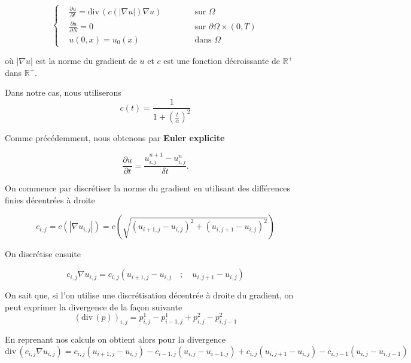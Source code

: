 \documentclass[a4paper,12pt,twoside]{report}
\newcommand{\R}{\mathbb{R}}
\newcommand{\1}{\mathbb{1}}
\renewcommand{\div}{\mathrm{div}\,}
\begin{document}
	\begin{equation*}
	\left\{
	\begin{aligned}
	&\frac{\partial u}{\partial t} = \div\left(c\left(\left|\nabla u\right|\right)\nabla u\right) &\qquad &\text{ sur } \Omega \\
	&\frac{\partial u}{\partial N} = 0 &\qquad &\text{ sur } \partial \Omega \times \left(0,T\right) \\
	&u(0,x) = u_0(x) &\qquad &\text{ dans } \Omega 
	\end{aligned}
	\right.
	\end{equation*}
	
	où $\left|\nabla u\right|$ est la norme du gradient de $u$ et $c$ est une fonction décroissante de $\R^+$ dans $\R^+$. 
	
	Dans notre cas, nous utiliserons 
	\[
	c(t) = \displaystyle\frac{1}{1+\left(\frac{t}{\alpha}\right)^2}	
	\]

	Comme précédemment, nous obtenons par \textbf{Euler explicite}
	
	\begin{equation*}
	\frac{\partial u}{\partial t}=\frac{u^{n+1}_{i,j}-u^{n}_{i,j}}{\delta t}.
	\end{equation*}
	
	On commence par discrétiser la norme du gradient en utilisant des différences finies décentrées à droite
	 
	\begin{equation*}
	c_{i,j} = c\left(\left|\nabla u_{i,j}\right|\right) = c\left(\sqrt{(u_{i+1,j}-u_{i,j})^2 +(u_{i,j+1} -u_{i,j})^2}\right)
	\end{equation*}
	
	On discrétise ensuite
	
	\begin{equation*}
	c_{i,j}\nabla u_{i,j} = c_{i,j}\left(u_{i+1,j}-u_{i,j} \quad ;\quad u_{i,j+1}-u_{i,j}\right)
	\end{equation*}
	
	On sait que, si l'on utilise une discrétisation décentrée à droite du gradient, on peut exprimer la divergence de la façon suivante
	\[
	\left(\div\left(p\right)\right)_{i,j} = p^1_{i,j} - p^1_{i-1,j} + p^2_{i,j} - p^2_{i,j-1}
	\]
	
	En reprenant nos calculs on obtient alors pour la divergence 	
	\begin{equation*}
	\div\left(c_{i,j}\nabla u_{i,j}\right) =  c_{i,j}\left(u_{i+1,j}-u_{i,j}\right)-c_{i-1,j}\left(u_{i,j}-u_{i-1,j}\right)+c_{i,j}\left(u_{i,j+1}-u_{i,j}\right)-c_{i,j-1}\left(u_{i,j}-u_{i,j-1}\right)
	\end{equation*}
	
\end{document}
